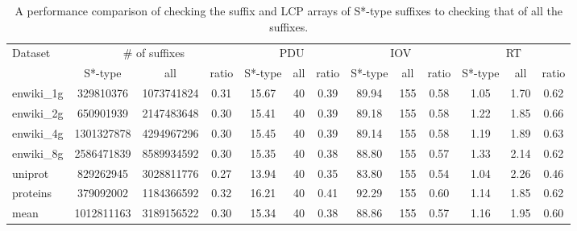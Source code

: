 \documentclass[10pt,journal,compsoc]{IEEEtran}
\begin{document}
	
	
\renewcommand\arraystretch{1.3}
\begin{table}
	\caption{A performance comparison of checking the suffix and LCP arrays of S*-type suffixes to checking that of all the suffixes.}
	\label{tbl:2}
	\centering
	\begin{tabular}{|l|c|c|c|c|c|c|c|c|c|c|c|c|}
		\hline
		\multirow{2}{*}{Dataset} & \multicolumn{3}{|c|}{\# of suffixes} & \multicolumn{3}{|c|}{PDU} & \multicolumn{3}{|c|}{IOV} & \multicolumn{3}{|c|}{RT} \\\cline{2-13}
						 & S*-type & all & ratio & S*-type & all & ratio & S*-type & all & ratio & S*-type & all & ratio \\\hline
		enwiki\_1g & 329810376 & 1073741824 & 0.31 & 15.67 & 40 & 0.39 & 89.94 & 155 & 0.58 & 1.05 & 1.70 & 0.62 \\\hline
		enwiki\_2g & 650901939 & 2147483648 & 0.30 & 15.41 & 40 & 0.39 & 89.18 & 155 & 0.58 & 1.22 & 1.85 & 0.66 \\\hline
		enwiki\_4g & 1301327878 & 4294967296 & 0.30 & 15.45 & 40 & 0.39 & 89.14 & 155 & 0.58 & 1.19 & 1.89 & 0.63 \\\hline
		enwiki\_8g & 2586471839 & 8589934592 & 0.30 & 15.35 & 40 & 0.38 & 88.80 & 155 & 0.57 & 1.33 & 2.14 & 0.62 \\\hline	
		uniprot & 829262945 & 3028811776 & 0.27 & 13.94 & 40 & 0.35 & 83.80 & 155 & 0.54 & 1.04 & 2.26 & 0.46 \\\hline
		proteins & 379092002 & 1184366592 & 0.32 & 16.21 & 40 & 0.41 & 92.29 & 155 & 0.60 & 1.14 & 1.85 & 0.62	\\\hline
		mean & 1012811163 & 3189156522 & 0.30 & 15.34 & 40 & 0.38 & 88.86 & 155 & 0.57 & 1.16 & 1.95 & 0.60 \\\hline
	\end{tabular}
\end{table}

\end{document}
